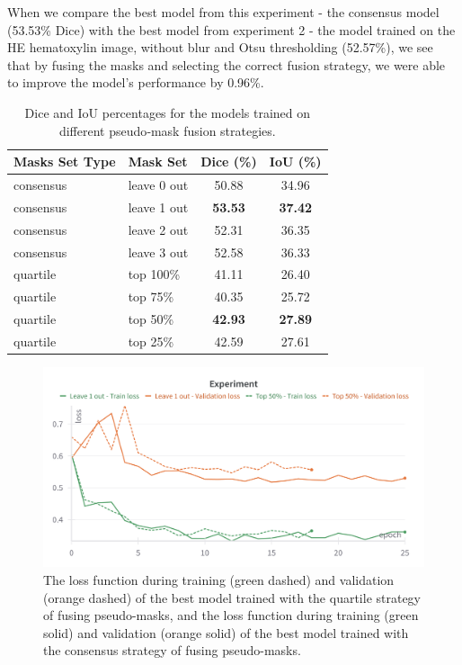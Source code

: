When we compare the best model from this experiment - the consensus model (53.53\% Dice) with the best model from experiment 2 - the model trained on the HE hematoxylin image, without blur and Otsu thresholding (52.57\%), we see that by fusing the masks and selecting the correct fusion strategy, we were able to improve the model's performance by 0.96\%.

\begin{table}[H]
  \centering
  \caption{Dice and IoU percentages for the models trained on different pseudo‐mask fusion strategies.}
  \begin{tabular}{ l | l | c | c } 
    \hline
    \textbf{Masks Set Type} & \textbf{Mask Set} & \textbf{Dice (\%)} & \textbf{IoU (\%)} \\
    \hline
      consensus & leave 0 out & 50.88 & 34.96 \\
      consensus & leave 1 out & \textbf{53.53} & \textbf{37.42} \\
      consensus & leave 2 out & 52.31 & 36.35 \\
      consensus & leave 3 out & 52.58 & 36.33 \\
    \hline
      quartile  & top 100\%   & 41.11 & 26.40 \\
      quartile  & top 75\%    & 40.35 & 25.72 \\
      quartile  & top 50\%    & \textbf{42.93} & \textbf{27.89} \\
      quartile  & top 25\%    & 42.59 & 27.61 \\
    \hline
  \end{tabular}
  \label{tab:fusion-strategies}
\end{table}

\begin{figure}[H]
\begin{centering}
\includegraphics[width=\textwidth]{assets/images/for_presentation/exp3-loss.png}
\par\end{centering}
\caption{The loss function during training (green dashed) and validation (orange dashed) of the best model trained with the quartile strategy of fusing pseudo-masks, and the loss function during training (green solid) and validation (orange solid) of the best model trained with the consensus strategy of fusing pseudo-masks.
\label{fig:exp3-loss}}
\end{figure}

